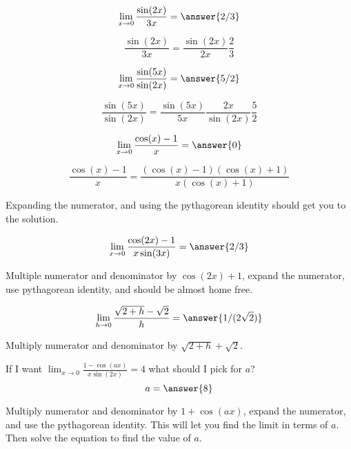 \documentclass[handout]{ximera}
\begin{document}
\begin{exercise}
\[\lim_{x \to 0} \frac{\sin(2x)}{3x} = \answer{2/3}\]
\begin{hint}
	\[\frac{\sin(2x)}{3x} = \frac{\sin(2x)}{2x} \frac{2}{3}\]
\end{hint}
\end{exercise}

\begin{exercise}
\[\lim_{x \to 0} \frac{\sin(5x)}{\sin(2x)} = \answer{5/2}\]
\begin{hint}
	\[ \frac{\sin(5x)}{\sin(2x)} = \frac{\sin(5x)}{5x} \frac{2x}{\sin(2x)} \frac{5}{2}\]
\end{hint}
\end{exercise}

\begin{exercise}
\[\lim_{x \to 0} \frac{\cos(x)-1}{x} = \answer{0}\]
\begin{hint}
	\[\frac{\cos(x)-1}{x} = \frac{(\cos(x)-1)(\cos(x)+1)}{x(\cos(x)+1)}\]
\end{hint}
\begin{hint}
	Expanding the numerator, and using the pythagorean identity should get you to the solution.
\end{hint}
\end{exercise}

\begin{exercise}
\[\lim_{x \to 0} \frac{\cos(2x)-1}{x\sin(3x)} = \answer{2/3}\]
\begin{hint}
	Multiple numerator and denominator by $\cos(2x)+1$, expand the numerator, use pythagorean identity, and should be almost home free.
\end{hint}
\end{exercise}

\begin{exercise}
	\[\lim_{h \to 0} \frac{\sqrt{2+h} - \sqrt{2}}{h} = \answer{1/(2\sqrt{2})}\]
	\begin{hint}
		Multiply numerator and denominator by $\sqrt{2+h}+\sqrt{2}$.
	\end{hint}
\end{exercise}

\begin{exercise}
If I want $\displaystyle\lim_{x \to 0} \frac{1-\cos(ax)}{x\sin(2x)} = 4$ what should I pick for $a$?
	\[a = \answer{8}\]
	\begin{hint}
		Multiply numerator and denominator by $1+\cos(ax)$, expand the numerator, and use the pythagorean identity.  This will let you find the limit in terms of $a$.  Then solve the equation to find the value of $a$.
	\end{hint}
\end{exercise}
\end{document}
